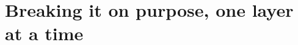 \chapter{Breaking it on purpose, one layer at a time}
\label{ch:breaking-it-on-purpose-one-layer-at-a}

